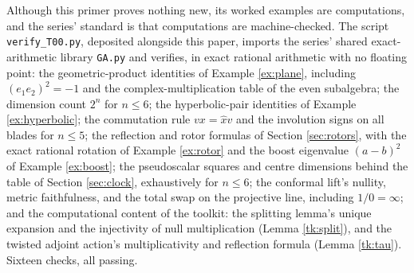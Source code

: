 \documentclass[11pt]{article}
\theoremstyle{plain}
\theoremstyle{definition}
\begin{document}
Although this primer proves nothing new, its worked examples are computations, and the series' standard is that computations are machine-checked. The script \texttt{verify\_T00.py}, deposited alongside this paper, imports the series' shared exact-arithmetic library \texttt{GA.py} and verifies, in exact rational arithmetic with no floating point: the geometric-product identities of Example \ref{ex:plane}, including $(e_1e_2)^2 = -1$ and the complex-multiplication table of the even subalgebra; the dimension count $2^{n}$ for $n \leq 6$; the hyperbolic-pair identities of Example \ref{ex:hyperbolic}; the commutation rule $vx = \hat{x}v$ and the involution signs on all blades for $n \leq 5$; the reflection and rotor formulas of Section \ref{sec:rotors}, with the exact rational rotation of Example \ref{ex:rotor} and the boost eigenvalue $(a-b)^{2}$ of Example \ref{ex:boost}; the pseudoscalar squares and centre dimensions behind the table of Section \ref{sec:clock}, exhaustively for $n \leq 6$; the conformal lift's nullity, metric faithfulness, and the total swap on the projective line, including $1/0 = \infty$; and the computational content of the toolkit: the splitting lemma's unique expansion and the injectivity of null multiplication (Lemma \ref{tk:split}), and the twisted adjoint action's multiplicativity and reflection formula (Lemma \ref{tk:tau}). Sixteen checks, all passing.
\end{document}
